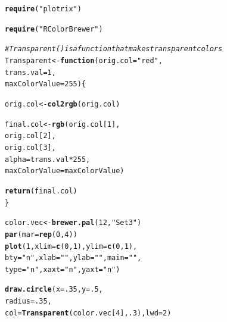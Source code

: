 \documentclass{tufte-book}\usepackage[]{graphicx}\usepackage[]{color}
\makeatletter
\newcommand{\hlnum}[1]{\textcolor[rgb]{0.686,0.059,0.569}{#1}}%
\newcommand{\hlstr}[1]{\textcolor[rgb]{0.192,0.494,0.8}{#1}}%
\newcommand{\hlcom}[1]{\textcolor[rgb]{0.678,0.584,0.686}{\textit{#1}}}%
\newcommand{\hlopt}[1]{\textcolor[rgb]{0,0,0}{#1}}%
\newcommand{\hlstd}[1]{\textcolor[rgb]{0.345,0.345,0.345}{#1}}%
\newcommand{\hlkwa}[1]{\textcolor[rgb]{0.161,0.373,0.58}{\textbf{#1}}}%
\newcommand{\hlkwb}[1]{\textcolor[rgb]{0.69,0.353,0.396}{#1}}%
\newcommand{\hlkwc}[1]{\textcolor[rgb]{0.333,0.667,0.333}{#1}}%
\newcommand{\hlkwd}[1]{\textcolor[rgb]{0.737,0.353,0.396}{\textbf{#1}}}%
\newenvironment{kframe}{%
 \def\at@end@of@kframe{}%
 \ifinner\ifhmode%
  \def\at@end@of@kframe{\end{minipage}}%
  \begin{minipage}{\columnwidth}%
 \fi\fi%
 \def\FrameCommand##1{\hskip\@totalleftmargin \hskip-\fboxsep
 \colorbox{shadecolor}{##1}\hskip-\fboxsep
     \hskip-\linewidth \hskip-\@totalleftmargin \hskip\columnwidth}%
 \MakeFramed {\advance\hsize-\width
   \@totalleftmargin\z@ \linewidth\hsize
   \@setminipage}}%
 {\par\unskip\endMakeFramed%
 \at@end@of@kframe}
\newenvironment{knitrout}{}{} %
\makeatother
\begin{document}
\begin{marginfigure}
\begin{tiny}
\begin{knitrout}
\color{fgcolor}\begin{kframe}
\begin{alltt}
\hlkwd{require}\hlstd{(}\hlstr{"plotrix"}\hlstd{)}
\end{alltt}


{\ttfamily\noindent\itshape\color{messagecolor}{\#\# Loading required package: plotrix}}

{\ttfamily\noindent\color{warningcolor}{\#\# Warning: package 'plotrix' was built under R version 3.2.3}}\begin{alltt}
\hlkwd{require}\hlstd{(}\hlstr{"RColorBrewer"}\hlstd{)}

\hlcom{# Transparent() is a function that makes transparent colors}
\hlstd{Transparent} \hlkwb{<-} \hlkwa{function}\hlstd{(}\hlkwc{orig.col} \hlstd{=} \hlstr{"red"}\hlstd{,}
                        \hlkwc{trans.val} \hlstd{=} \hlnum{1}\hlstd{,}
                        \hlkwc{maxColorValue} \hlstd{=} \hlnum{255}\hlstd{) \{}

  \hlstd{orig.col} \hlkwb{<-} \hlkwd{col2rgb}\hlstd{(orig.col)}

  \hlstd{final.col} \hlkwb{<-} \hlkwd{rgb}\hlstd{(orig.col[}\hlnum{1}\hlstd{],}
                   \hlstd{orig.col[}\hlnum{2}\hlstd{],}
                   \hlstd{orig.col[}\hlnum{3}\hlstd{],}
                   \hlkwc{alpha} \hlstd{= trans.val} \hlopt{*} \hlnum{255}\hlstd{,}
                   \hlkwc{maxColorValue} \hlstd{= maxColorValue)}

  \hlkwd{return}\hlstd{(final.col)}
\hlstd{\}}


\hlstd{color.vec} \hlkwb{<-} \hlkwd{brewer.pal}\hlstd{(}\hlnum{12}\hlstd{,} \hlstr{"Set3"}\hlstd{)}
\hlkwd{par}\hlstd{(}\hlkwc{mar} \hlstd{=} \hlkwd{rep}\hlstd{(}\hlnum{0}\hlstd{,} \hlnum{4}\hlstd{))}
\hlkwd{plot}\hlstd{(}\hlnum{1}\hlstd{,} \hlkwc{xlim} \hlstd{=} \hlkwd{c}\hlstd{(}\hlnum{0}\hlstd{,} \hlnum{1}\hlstd{),} \hlkwc{ylim} \hlstd{=} \hlkwd{c}\hlstd{(}\hlnum{0}\hlstd{,} \hlnum{1}\hlstd{),}
     \hlkwc{bty} \hlstd{=} \hlstr{"n"}\hlstd{,} \hlkwc{xlab} \hlstd{=} \hlstr{""}\hlstd{,} \hlkwc{ylab} \hlstd{=} \hlstr{""}\hlstd{,} \hlkwc{main} \hlstd{=} \hlstr{""}\hlstd{,}
     \hlkwc{type} \hlstd{=} \hlstr{"n"}\hlstd{,} \hlkwc{xaxt} \hlstd{=} \hlstr{"n"}\hlstd{,} \hlkwc{yaxt} \hlstd{=} \hlstr{"n"}\hlstd{)}

\hlkwd{draw.circle}\hlstd{(}\hlkwc{x} \hlstd{=} \hlnum{.35}\hlstd{,} \hlkwc{y} \hlstd{=} \hlnum{.5}\hlstd{,}
            \hlkwc{radius} \hlstd{=} \hlnum{.35}\hlstd{,}
            \hlkwc{col} \hlstd{=} \hlkwd{Transparent}\hlstd{(color.vec[}\hlnum{4}\hlstd{],} \hlnum{.3}\hlstd{),} \hlkwc{lwd} \hlstd{=} \hlnum{2}\hlstd{)}


\end{alltt}
\end{kframe}
\end{knitrout}
\end{tiny}
\end{marginfigure}
\end{document}
